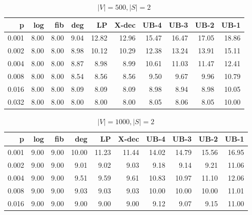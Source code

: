 \begin{table}[]
\centering
\begin{tabular}{rrrrrrrrrr}
p     & log  & fib  & deg  & LP    & X-dec & UB-4  & UB-3  & UB-2  & UB-1  \\
\hline
0.001 & 8.00 & 8.00 & 9.04 & 12.82 &12.96  &15.47  & 16.47 & 17.05 & 18.86 \\
0.002 & 8.00 & 8.00 & 8.98 & 10.12 &10.29  &12.38  & 13.24 & 13.91 & 15.11 \\
0.004 & 8.00 & 8.00 & 8.87 & 8.98  &8.99   &10.61  & 11.03 & 11.47 & 12.41 \\
0.008 & 8.00 & 8.00 & 8.54 & 8.56  &8.56   &9.50   & 9.67  & 9.96  & 10.79 \\
0.016 & 8.00 & 8.00 & 8.09 & 8.09  &8.09   &8.98   & 8.94  & 8.98  & 10.05 \\
0.032 & 8.00 & 8.00 & 8.00 & 8.00  &8.00   &8.05   & 8.06  & 8.05  & 10.00
\end{tabular}
\caption{$|V|=500, |S|=2$}
\label{tab:lbup1000}
\end{table}

\begin{table}[]
\centering
\begin{tabular}{rrrrrrrrrr}
p     & log  & fib  & deg  & LP    & X-dec & UB-4  & UB-3  & UB-2  & UB-1  \\
\hline
0.001 & 9.00 & 9.00 & 10.00 & 11.23 & 11.44 & 14.02 & 14.79 & 15.56 & 16.95 \\
0.002 & 9.00 & 9.00 & 9.01  & 9.02  & 9.03  & 9.18  & 9.14  & 9.21  & 11.06 \\
0.004 & 9.00 & 9.00 & 9.51  & 9.59  & 9.61  & 10.83 & 10.97 & 11.10 & 12.06 \\
0.008 & 9.00 & 9.00 & 9.03  & 9.03  & 9.03  & 10.00 & 10.00 & 10.00 & 11.01 \\
0.016 & 9.00 & 9.00 & 9.00  & 9.00  & 9.00  & 9.12  & 9.07  & 9.15  & 11.00 \\
\end{tabular}
\caption{$|V|=1000, |S|=2$}
\label{tab:lbup1000}
\end{table}

